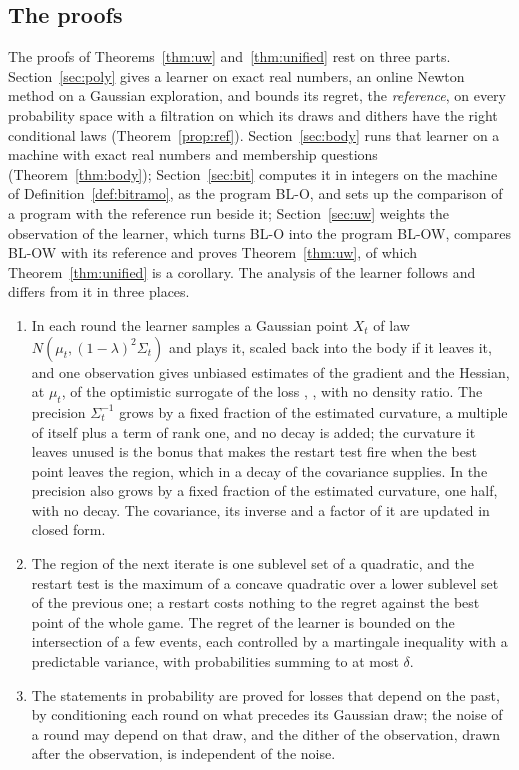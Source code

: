 \documentclass[11pt]{amsart}
\theoremstyle{definition}
\numberwithin{equation}{section}
\begin{document}
\subsection{The proofs}\label{sec:intro-proofs}

The proofs of Theorems~\ref{thm:uw} and~\ref{thm:unified} rest on three parts. Section~\ref{sec:poly} gives a learner on exact real numbers, an online Newton method on a Gaussian exploration, and bounds its regret, the \emph{reference}, on every probability space with a filtration on which its draws and dithers have the right conditional laws (Theorem~\ref{prop:ref}). Section~\ref{sec:body} runs that learner on a machine with exact real numbers and membership questions (Theorem~\ref{thm:body}); Section~\ref{sec:bit} computes it in integers on the machine of Definition~\ref{def:bitramo}, as the program BL-O, and sets up the comparison of a program with the reference run beside it; Section~\ref{sec:uw} weights the observation of the learner, which turns BL-O into the program BL-OW, compares BL-OW with its reference and proves Theorem~\ref{thm:uw}, of which Theorem~\ref{thm:unified} is a corollary. The analysis of the learner follows \cite[Chapter~11]{Lat24} and differs from it in three places.
\begin{enumerate}[label=(\arabic*)]
\item In each round the learner samples a Gaussian point $X_t$ of law $N(\mu_t,(1-\lambda)^2\Sigma_t)$ and plays it, scaled back into the body if it leaves it, and one observation gives unbiased estimates of the gradient and the Hessian, at $\mu_t$, of the optimistic surrogate of the loss \cite{LG21a}, \cite[Chapter~12]{Lat24}, with no density ratio. The precision $\Sigma_t^{-1}$ grows by a fixed fraction of the estimated curvature, a multiple of itself plus a term of rank one, and no decay is added; the curvature it leaves unused is the bonus that makes the restart test fire when the best point leaves the region, which in \cite[Chapter~11]{Lat24} a decay of the covariance supplies. In \cite[Section~4]{BJLR26} the precision also grows by a fixed fraction of the estimated curvature, one half, with no decay. The covariance, its inverse and a factor of it are updated in closed form.
\item The region of the next iterate is one sublevel set of a quadratic, and the restart test is the maximum of a concave quadratic over a lower sublevel set of the previous one; a restart costs nothing to the regret against the best point of the whole game. The regret of the learner is bounded on the intersection of a few events, each controlled by a martingale inequality with a predictable variance, with probabilities summing to at most $\delta$.
\item The statements in probability are proved for losses that depend on the past, by conditioning each round on what precedes its Gaussian draw; the noise of a round may depend on that draw, and the dither of the observation, drawn after the observation, is independent of the noise.
\end{enumerate}
\end{document}
